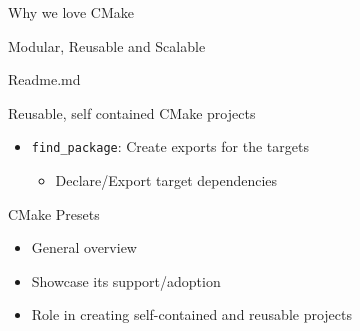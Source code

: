 \documentclass{beamer}
\begin{document}
\begin{frame}[fragile]{Why we love CMake}
\begin{block}{Modular, Reusable and Scalable}
\begin{itemize}
		\end{itemize}%
	\end{block}%
\end{frame}
\begin{frame}[fragile]{Readme.md}\small%
	\vspace{0.2cm}
	\begin{center}
	\begin{block}{Reusable, self contained CMake projects}
		\begin{itemize}
			\item \texttt{find\_package}: Create exports for the targets
				\begin{itemize}
					\item Declare/Export target dependencies
				\end{itemize}
		\end{itemize}
	\end{block}
	\vspace{0.4cm}
	\begin{block}{CMake Presets}
			\begin{itemize}
				\item General overview
				\item Showcase its support/adoption
				\item Role in creating self-contained and reusable projects
			\end{itemize}
	\end{block}
	\end{center}
\end{frame}
\end{document}
